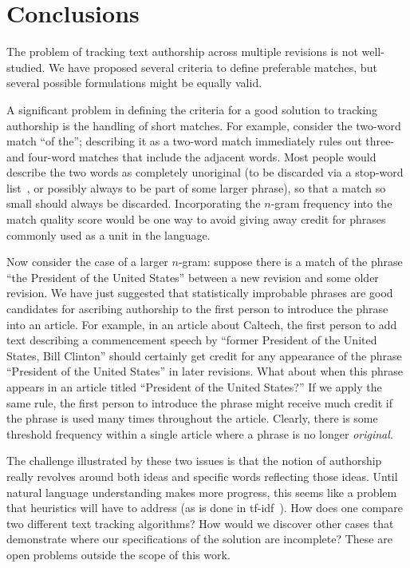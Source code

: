 \section{Conclusions}

The problem of tracking text authorship across multiple revisions
is not well-studied.
We have proposed several criteria to define preferable matches,
but several possible formulations
might be equally valid.

A significant problem in defining the criteria for a
good solution to tracking authorship is the handling of short matches.
For example, consider the two-word match ``of the''; describing
it as a two-word match immediately rules out three- and four-word
matches that include the adjacent words.
Most people would describe the two words as completely
unoriginal (to be discarded via a stop-word list~\cite{Kinzler2011},
or possibly always to be part of some larger phrase),
so that a match so small should always be discarded.
Incorporating the $n$-gram frequency into the match quality
score would be one way to avoid giving away credit for phrases
commonly used as a unit in the language.

Now consider the case of a larger $n$-gram: suppose there is a match
of the phrase ``the President of the United States'' between a new
revision and some older revision.
We have just suggested that statistically improbable phrases are
good candidates for ascribing authorship to the first person to
introduce the phrase into an article.
For example, in an article about Caltech, the first person to
add text describing a commencement speech by ``former President of
the United States, Bill Clinton'' should certainly get credit for
any appearance of the phrase ``President of the United States''
in later revisions.
What about when this phrase appears in an article titled
``President of the United States?''
If we apply the same rule, the first person to introduce the phrase
might receive much credit if the phrase is used many times throughout
the article.
Clearly, there is some threshold frequency within a single
article where a phrase is no longer \textit{original}.

The challenge illustrated by these two issues is that the notion
of authorship really revolves around both ideas and specific
words reflecting those ideas.
Until natural language understanding makes more progress, this seems
like a problem that heuristics will have to address
(\eg as is done in tf-idf~\cite{Jones1972}).
How does one compare two different text tracking algorithms?
How would we discover other cases that demonstrate where our
specifications of the solution are incomplete?
These are open problems outside the scope of this work.


